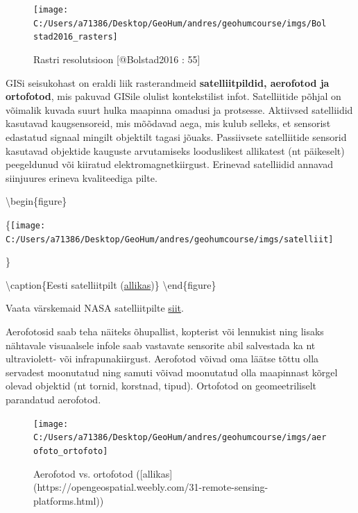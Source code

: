 \documentclass[
]{book}
\begin{document}
\begin{figure}

{\centering \texttt{[image: C:/Users/a71386/Desktop/GeoHum/andres/geohumcourse/imgs/Bolstad2016\_rasters]} 

}

\caption{Rastri resolutsioon [@Bolstad2016 : 55]}\label{fig:unnamed-chunk-2}
\end{figure}

GISi seisukohast on eraldi liik rasterandmeid \textbf{satelliitpildid, aerofotod ja ortofotod}, mis pakuvad GISile olulist kontekstilist infot.
Satelliitide põhjal on võimalik kuvada suurt hulka maapinna omadusi ja protsesse. Aktiivsed satelliidid kasutavad kaugsensoreid, mis mõõdavad aega, mis kulub selleks, et sensorist edastatud signaal mingilt objektilt tagasi jõuaks. Passiivsete satelliitide sensorid kasutavad objektide kauguste arvutamiseks looduslikest allikatest (nt päikeselt) peegeldunud või kiiratud elektromagnetkiirgust. Erinevad satelliidid annavad siinjuures erineva kvaliteediga pilte.

\textbackslash begin\{figure\}

\{\centering \texttt{[image: C:/Users/a71386/Desktop/GeoHum/andres/geohumcourse/imgs/satelliit]}

\}

\textbackslash caption\{Eesti satelliitpilt (\href{https://commons.wikimedia.org/wiki/File:Satellite_image_of_Estonia_in_April_2004.jpg}{allikas})\}\label{fig:satelliit}
\textbackslash end\{figure\}

Vaata värskemaid NASA satelliitpilte \href{https://wvs.earthdata.nasa.gov/?COORDINATES=55.0171,17.8288,61.4922,35.0957}{siit}.

Aerofotosid saab teha näiteks õhupallist, kopterist või lennukist ning lisaks nähtavale visuaalsele infole saab vastavate sensorite abil salvestada ka nt ultraviolett- või infrapunakiirgust. Aerofotod võivad oma läätse tõttu olla servadest moonutatud ning samuti võivad moonutatud olla maapinnast kõrgel olevad objektid (nt tornid, korstnad, tipud). Ortofotod on geomeetriliselt parandatud aerofotod.

\begin{figure}

{\centering \texttt{[image: C:/Users/a71386/Desktop/GeoHum/andres/geohumcourse/imgs/aerofoto\_ortofoto]} 

}

\caption{Aerofotod vs. ortofotod ([allikas](https://opengeospatial.weebly.com/31-remote-sensing-platforms.html))}\label{fig:aero-orto}
\end{figure}
\end{document}
